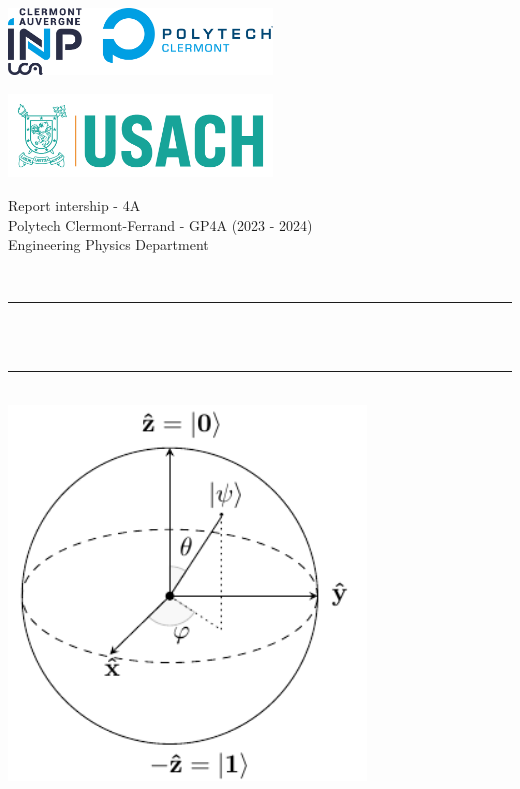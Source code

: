 
\begin{titlepage}

	\begin{minipage}{0.45\textwidth}
		\centering
		\includegraphics[width=7cm]{first_page/logo/logo_inp_polytech_2023.png}
	  \end{minipage}
	  \hfill
	  \begin{minipage}{0.45\textwidth}
		\centering
		\includegraphics[width=7cm]{first_page/logo/Usach S1.png}
	  \end{minipage}
	  

\begin{center}
	\Large{Report intership - 4A} \\
	\Large{Polytech Clermont-Ferrand - GP4A (2023 - 2024)}	\\
	Engineering Physics Department
\end{center}
\vspace*{-2cm}
	\newcommand{\HRule}{\rule{\linewidth}{0.5mm}}
	\centering 
	\quad\\[1.5cm]
	
	
	\makeatletter
	\HRule \\[0.4cm]
	{ \huge \bfseries \@title}\\[0.4cm] 
	\HRule \\[1cm]
	
	\includegraphics[width=9.5cm]{tikz/bloch_sphere/bloch_sphere.pdf}
	


\end{titlepage}
